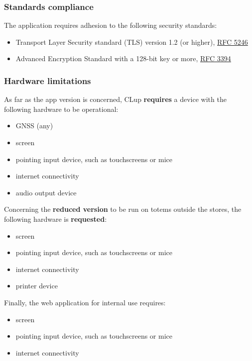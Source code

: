 \subsubsection{Standards compliance}
\label{standards}
The application requires adhesion to the following security standards:\newline 
\begin{itemize}
    \item Transport Layer Security standard (TLS) version 1.2 (or higher), \href{https://tools.ietf.org/html/rfc5246}{RFC 5246}
    \item Advanced Encryption Standard with a 128-bit key or more, \href{http://www.networksorcery.com/enp/rfc/rfc3394.txt}{RFC 3394}
\end{itemize}

\subsubsection{Hardware limitations}
As far as the app version is concerned, CLup \textbf{requires} a device with the following hardware to be operational:\newline
\begin{itemize}
    \item GNSS (any)
    \item screen
    \item pointing input device, such as touchscreens or mice
    \item internet connectivity
    \item audio output device
\end{itemize}

\bigskip \noindent Concerning the \textbf{reduced version} to be run on totems outside the stores, the following hardware is \textbf{requested}:\newline
\begin{itemize}
    \item screen
    \item pointing input device, such as touchscreens or mice
    \item internet connectivity
    \item printer device
\end{itemize}

\bigskip \noindent Finally, the web application for internal use requires: \newline
\begin{itemize}
    \item screen
    \item pointing input device, such as touchscreens or mice
    \item internet connectivity
\end{itemize}



